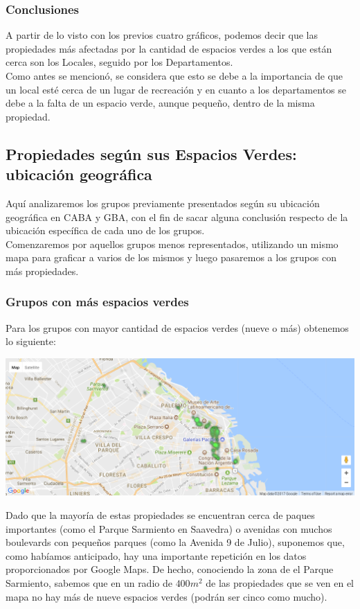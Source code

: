 \documentclass[a4paper, 10pt]{article}
\newcommand\tab[1][0.5cm]{\hspace*{#1}}
\begin{document}
			\subsubsection{Conclusiones}
				A partir de lo visto con los previos cuatro gráficos, podemos decir que las propiedades más afectadas por la
				cantidad de espacios verdes a los que están cerca son los Locales, seguido por los Departamentos. \\
				\tab Como antes se mencionó, se considera que esto se debe a la importancia de que un local esté cerca de un lugar
				de recreación y en cuanto a los departamentos se debe a la falta de un espacio verde, aunque pequeño, dentro de la
				misma propiedad.
		\subsection{Propiedades según sus Espacios Verdes: ubicación geográfica}
			Aquí analizaremos los grupos previamente presentados según su ubicación geográfica en CABA y GBA, con el fin de sacar
			alguna conclusión respecto de la ubicación específica de cada uno de los grupos. \\
			\tab Comenzaremos por aquellos grupos menos representados, utilizando un mismo mapa para graficar a varios de los mismos
			y luego pasaremos a los grupos con más propiedades. \\
			\subsubsection{Grupos con más espacios verdes}
				Para los grupos con mayor cantidad de espacios verdes (nueve o más) obtenemos lo siguiente:
				\begin{center}
					\includegraphics[width=\textwidth]{images/parksMost}
				\end{center}
				\tab Dado que la mayoría de estas propiedades se encuentran cerca de paques importantes (como el Parque Sarmiento en
				Saavedra) o avenidas con muchos boulevards con pequeños parques (como la Avenida 9 de Julio), suponemos que, como
				habíamos anticipado, hay una importante repetición en los datos proporcionados por Google Maps. De hecho, conociendo
				la zona de el Parque Sarmiento, sabemos que en un radio de $400m^2$ de las propiedades que se ven en el mapa no hay
				más de nueve espacios verdes (podrán ser cinco como mucho). \\
\end{document}
